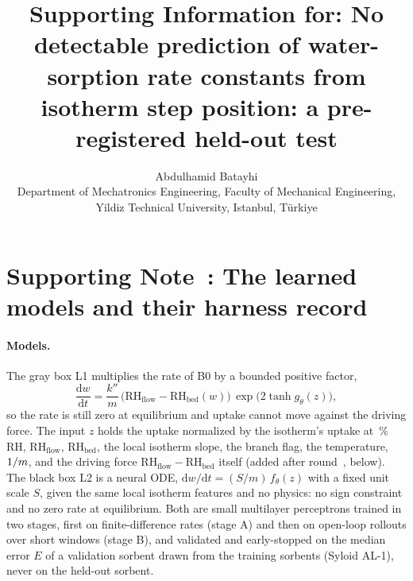\documentclass[11pt]{article}
\title{Supporting Information for: No detectable prediction of water-sorption rate constants from isotherm step position: a pre-registered held-out test}
\author{Abdulhamid Batayhi\\ Department of Mechatronics Engineering, Faculty of Mechanical Engineering,\\ Yildiz
Technical University, \ID{34220} Istanbul, T\"urkiye}
\date{}
\newcommand{\kpp}{k''}
\newcommand{\RHf}{\mathrm{RH}_{\mathrm{flow}}}
\newcommand{\RHb}{\mathrm{RH}_{\mathrm{bed}}}
\begin{document}
\maketitle

\section*{Supporting Note~: The learned models and their harness record}

\paragraph{Models.} The gray box L1 multiplies the rate of B0 by a bounded positive factor,
\begin{equation}
\frac{\mathrm{d}w}{\mathrm{d}t} = \frac{\kpp}{m}\,\bigl(\RHf - \RHb(w)\bigr)\,\exp\!\bigl(2\tanh g_\theta(z)\bigr),
\end{equation}
so the rate is still zero at equilibrium and uptake cannot move against the driving force. The input $z$ holds the
uptake normalized by the isotherm's uptake at \,\% RH, $\RHf$, $\RHb$, the local isotherm slope, the
branch flag, the temperature, $1/m$, and the driving force $\RHf - \RHb$ itself (added after round~, below). The
black box L2 is a neural ODE, $\mathrm{d}w/\mathrm{d}t = (S/m)\,f_\theta(z)$ with a fixed unit scale $S$, given the
same local isotherm features and no physics: no sign constraint and no zero rate at equilibrium. Both are small
multilayer perceptrons trained in two stages, first on finite-difference rates (stage A) and then on open-loop
rollouts over short windows (stage B), and validated and early-stopped on the median error $E$ of a validation
sorbent drawn from the training sorbents (Syloid AL-1), never on the held-out sorbent.
\end{document}
